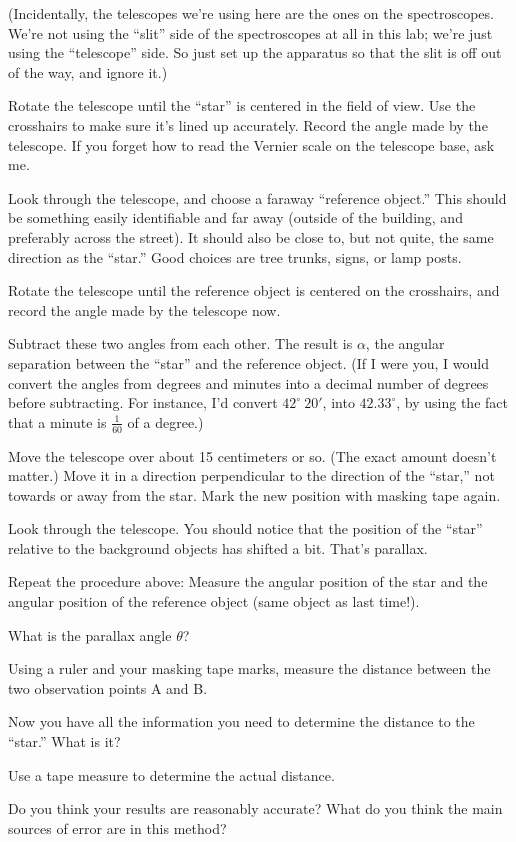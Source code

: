 (Incidentally, the telescopes we're using here are the ones on the
spectroscopes.  We're not using the ``slit'' side of the spectroscopes
at all in this lab; we're just using the ``telescope'' side.  So 
just set up the apparatus so that the slit is off out of the way, and
ignore it.)

Rotate the telescope until the ``star'' is centered in the field of view.
Use the crosshairs to make sure it's lined up accurately.
Record the angle made by the telescope.  If you forget how to read
the Vernier scale on the telescope base, ask me.

\answerspace{1in}

Look through the telescope, and choose a faraway ``reference object.''
This should be something easily identifiable and far away (outside
of the building, and preferably across the street).  It should also
be close to, but not quite, the same direction as the ``star.''
Good choices are tree trunks, signs, or lamp posts.

Rotate the telescope until the reference object is centered on the crosshairs,
and record the angle made by the telescope now.

\answerspace{1in}

Subtract these two angles from each other.  The result is $\alpha$,
the angular separation between the ``star'' and the reference
object.  (If I were you, I would convert the angles from degrees
and minutes into a decimal number of degrees before subtracting.
For instance, I'd convert $42^\circ\ 20'$, into $42.33^\circ$,
by using the fact that a minute is $\frac{1}{60}$ of a degree.)

\answerspace{1in}

Move the telescope over about 15 centimeters or so.  (The exact amount
doesn't matter.)  Move it in a direction perpendicular to the direction
of the ``star,'' not towards or away from the star.
Mark the new position with masking tape again.

Look through the telescope.  You should notice that the position
of the ``star'' relative to the background objects has shifted
a bit.  That's parallax.

Repeat the procedure above: Measure the angular position of the
star and the angular position of the reference object (same object
as last time!).  
\answerspace{1.8in}

\pagebreak[3]
What is the parallax angle $\theta$?

\answerspace{1in}

Using a ruler and your masking tape marks, measure the distance between
the two observation points A and B.

\answerspace{1in}

Now you have all the information you need to determine the distance to
the ``star.''  What is it?

\answerspace{1in}

Use a tape measure to determine the actual distance.

\answerspace{1in}

Do you think your results are reasonably accurate?  What
do you think the main sources of error are in this method?






